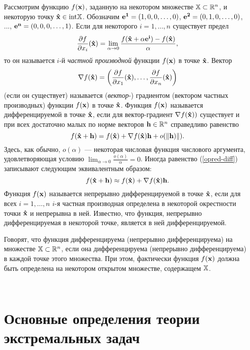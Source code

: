     Рассмотрим функцию $f(\mathbf{x})$, заданную на некотором множестве
    $\mathbb{X}\subset\mathbb{R}^{n}$, и некоторую точку
    $\mathbf{\hat{x}}\in\text{int}\mathbb{X}$. Обозначим
    $\mathbf{e^{1}}=(1,0,0,\ldots,0)$,  $\mathbf{e^{2}}=(0,1,0,\ldots,0)$,
    ..., $\mathbf{e^{n}}=(0,0,0,\ldots,1)$.
    Если для некоторого
    $i=1,\ldots,n$ существует предел
\[
    \frac{\partial f}{\partial x_{i}}(\mathbf{\hat{x}})
    =\lim _{\alpha\rightarrow 0}
    \frac{f(\mathbf{\hat{x}}+\alpha\mathbf{e^{i}})-f(\mathbf{\hat{x}})}{\alpha},
\]
    то он называется $i$-й \emph{частной производной} функции $f(\mathbf{x})$ в
    точке $\mathbf{\hat{x}}$.
    Вектор
    \[\nabla f(\mathbf{\hat{x}})=\left(\frac{\partial f}{\partial x_{1}}(\mathbf{\hat{x}}),\ldots,
    \frac{\partial f}{\partial x_{n}}(\mathbf{\hat{x}})\right)\] (если он существует) называется (\emph{вектор}-)
    градиентом (вектором частных производных) функции $f(\mathbf{x})$ в
    точке $\mathbf{\hat{x}}$.
    Функция $f(\mathbf{x})$ называется дифференцируемой в точке
    $\mathbf{\hat{x}}$, если для вектор-градиент $\nabla
    f(\mathbf{\hat{x}}))$ существует и при всех достаточно малых по
    норме векторов
    $\mathbf{h}\in\mathbb{R}^{n}$ справедливо равенство
\begin{equation}
    \label{opred-diff}
    f(\mathbf{\hat{x}}+\mathbf{h})=f(\mathbf{\hat{x}})
    +\nabla f(\mathbf{\hat{x}})\mathbf{h}
    + o(\|\mathbf{h})\|).
\end{equation}
    Здесь, как обычно, $o(\alpha)$ --- некоторая числовая функция
    числового аргумента, удовлетворяющая условию
    $\lim_{\alpha\rightarrow 0}\frac{o(\alpha)}{\alpha}=0$. Иногда
    равенство (\ref{opred-diff}) записывают следующим эквивалентным образом:
\[
    f(\mathbf{\hat{x}}+\mathbf{h})\approx f(\mathbf{\hat{x}})
    +\nabla f(\mathbf{\hat{x}})\mathbf{h}.
\]
    Функция $f(\mathbf{x})$ называется непрерывно дифференцируемой в точке
    $\mathbf{\hat{x}}$, если для всех $i=1,\ldots,n$ $i$-я частная
    производная определена в некоторой окрестности точки $\mathbf{\hat{x}}$ и
    непрерывна в ней. Известно, что функция, непрерывно
    дифференцируемая в некоторой точке, является в ней
    дифференцируемой.

    Говорят, что функция дифференцируема (непрерывно
    дифференцируема) на множестве $\mathbb{X}\subset\mathbb{R}^{n}$, если она
    дифференцируема (непрерывно дифференцируема) в каждой точке
    этого множества. При этом, фактически функция $f(\mathbf{x})$ должна
    быть определена на некотором открытом множестве, содержащем
    $\mathbb{X}$.



\

\section{Основные определения теории экстремальных задач}


